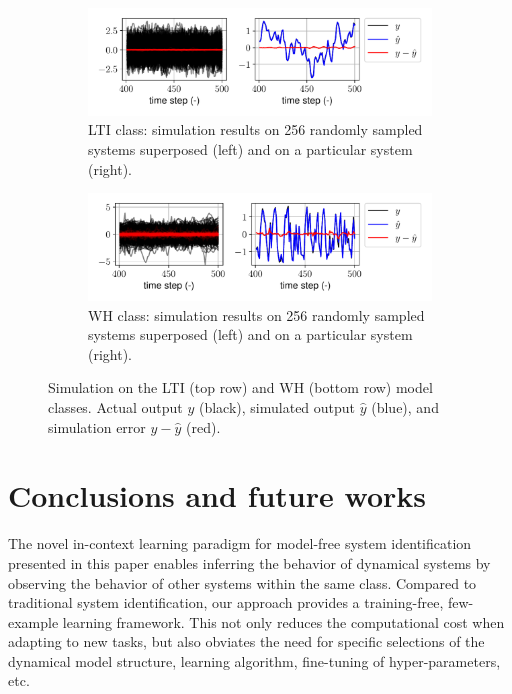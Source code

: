 \documentclass{article}
\begin{document}
\begin{figure}
    \centering
    \begin{subfigure}[t]{0.99\textwidth}
        \centering
        \includegraphics[width=\textwidth]{fig/lin_sim_batch_single.pdf}
        \caption{LTI class: simulation results on 256 randomly sampled systems {superposed} (left) and on a particular system (right).}
        \label{fig:lin_sim_batch}
    \end{subfigure}
    \hfill
    \begin{subfigure}[t]{0.99\textwidth}
        \centering
        \includegraphics[width=\textwidth]{fig/wh_sim_batch_single.pdf}
        \caption{WH class: simulation results on 256 randomly sampled systems superposed (left) and on a particular system (right).}
        \label{fig:lin_sim_single}
    \end{subfigure}
    
    \caption{Simulation on the LTI (top row) and WH (bottom row) model classes. Actual output $y$ (black), simulated output $\hat y$ (blue), and simulation error $y-\hat y$ (red). }
    \label{fig:sim}
\end{figure}



\section{Conclusions and future works}
The novel in-context learning paradigm for model-free system identification presented in this paper enables inferring the behavior of dynamical systems by observing the behavior of other systems within the same class. Compared to traditional system identification, our approach provides a training-free, few-example learning framework. This not only reduces the computational cost when adapting to new tasks, but also obviates the need for specific selections of the dynamical model structure, learning algorithm, fine-tuning of hyper-parameters, etc. 
\end{document}
